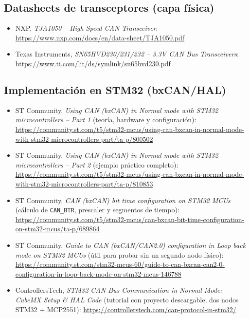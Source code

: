 \documentclass[pdflatex,sn-mathphys-num]{sn-jnl}%
\begin{document}
\subsection{Datasheets de transceptores (capa física)}
\begin{itemize}
    \item NXP, \textit{TJA1050 -- High Speed CAN Transceiver}: \url{https://www.nxp.com/docs/en/data-sheet/TJA1050.pdf}
    \item Texas Instruments, \textit{SN65HVD230/231/232 -- 3.3V CAN Bus Transceivers}: \url{https://www.ti.com/lit/ds/symlink/sn65hvd230.pdf}
\end{itemize}

\subsection{Implementación en STM32 (bxCAN/HAL)}
\begin{itemize}
    \item ST Community, \textit{Using CAN (bxCAN) in Normal mode with STM32 microcontrollers -- Part 1} (teoría, hardware y configuración): \url{https://community.st.com/t5/stm32-mcus/using-can-bxcan-in-normal-mode-with-stm32-microcontrollers-part/ta-p/800502}
    \item ST Community, \textit{Using CAN (bxCAN) in Normal mode with STM32 microcontrollers -- Part 2} (ejemplo práctico completo): \url{https://community.st.com/t5/stm32-mcus/using-can-bxcan-in-normal-mode-with-stm32-microcontrollers-part/ta-p/810853}
    \item ST Community, \textit{CAN (bxCAN) bit time configuration on STM32 MCUs} (cálculo de \texttt{CAN\_BTR}, prescaler y segmentos de tiempo): \url{https://community.st.com/t5/stm32-mcus/can-bxcan-bit-time-configuration-on-stm32-mcus/ta-p/689864}
    \item ST Community, \textit{Guide to CAN (bxCAN/CAN2.0) configuration in Loop back mode on STM32 MCUs} (útil para probar sin un segundo nodo físico): \url{https://community.st.com/stm32-mcus-60/guide-to-can-bxcan-can2-0-configuration-in-loop-back-mode-on-stm32-mcus-146788}
    \item ControllersTech, \textit{STM32 CAN Bus Communication in Normal Mode: CubeMX Setup \& HAL Code} (tutorial con proyecto descargable, dos nodos STM32 + MCP2551): \url{https://controllerstech.com/can-protocol-in-stm32/}
\end{itemize}
\end{document}
